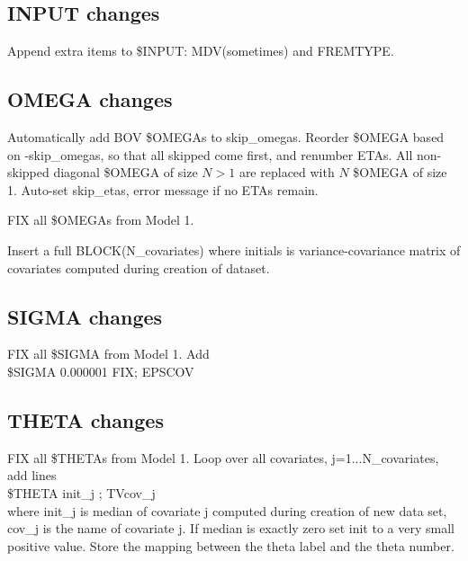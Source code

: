 \subsection{INPUT changes}
Append extra items to \$INPUT: MDV(sometimes) and FREMTYPE.

\subsection{OMEGA changes}
Automatically add BOV \$OMEGAs to skip\_omegas.
Reorder \$OMEGA based on -skip\_omegas, so that all skipped come first, and renumber ETAs.
All non-skipped diagonal \$OMEGA of size $N>1$
are replaced with $N$ \$OMEGA of size 1.
Auto-set skip\_etas, error message if no ETAs remain.

FIX all \$OMEGAs from Model 1.

Insert
a full BLOCK(N\_covariates) where initials is variance-covariance matrix of
covariates computed during creation of dataset.

\subsection{SIGMA changes}
FIX all \$SIGMA from Model 1.
Add\\
\$SIGMA 0.000001 FIX; EPSCOV

\subsection{THETA changes}
FIX all \$THETAs from Model 1.
Loop over all covariates, j=1...N\_covariates, %
add lines\\
\$THETA init\_j ; TVcov\_j\\
where init\_j is median of covariate j computed during creation of new data set, cov\_j is the name of covariate
j. %
If median is exactly zero set
init to a very small positive value. 
Store the mapping between the theta label and the theta number.%
